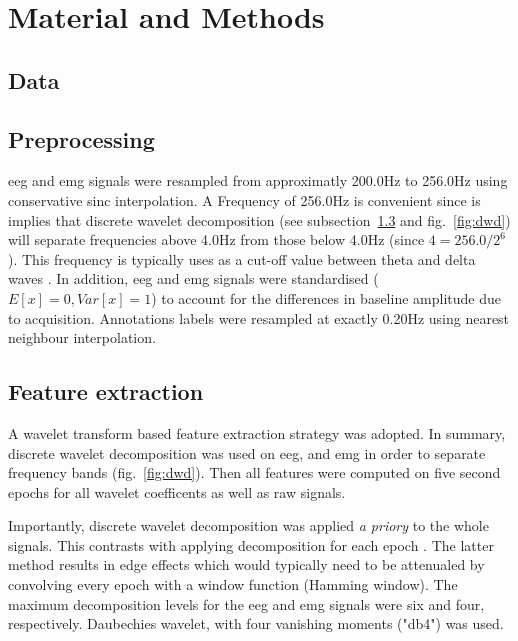 \section{Material and Methods} \label{matmet}


\subsection{Data}


\subsection{Preprocessing}

\gls{eeg} and \gls{emg} signals were resampled from approximatly 200.0Hz to 256.0Hz using
conservative sinc interpolation. 
A Frequency of 256.0Hz is convenient since is implies that discrete wavelet decomposition (see subsection~\ref{sub:features} and fig.~\ref{fig:dwd}) will separate 
frequencies above 4.0Hz from those below 4.0Hz (since $4 = 256.0/{2^6} $).
This frequency is typically uses as a cut-off value between theta and delta waves \citationneeded{}.
In addition, \gls{eeg} and \gls{emg} signals were standardised ($E[x] = 0, Var[x] = 1$) to account for the differences in baseline amplitude due to acquisition.
Annotations labels were resampled at exactly 0.20Hz using nearest neighbour interpolation.

\subsection{Feature extraction}
\label{sub:features}

A wavelet transform based feature extraction strategy was adopted.
In summary, discrete wavelet decomposition was used on \gls{eeg}, and \gls{emg} 
in order to separate frequency bands (fig.~\ref{fig:dwd}).
Then all features were computed on five second epochs for all wavelet coefficents as well as raw signals.




Importantly, discrete wavelet decomposition was applied \emph{a priory} to the whole signals.
This contrasts with applying decomposition for each epoch \citationneeded{}.
The latter method results in edge effects which would typically need to be attenualed by convolving every epoch with a window function (\eg Hamming window).
The maximum decomposition levels for the \gls{eeg} and \gls{emg} signals were six and four, respectively.
Daubechies wavelet, with four vanishing moments ("db4") was used.

